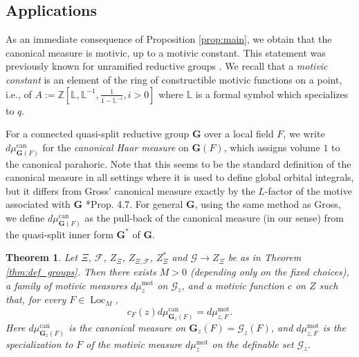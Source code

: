 \documentclass{amsart}
\newcommand{\Z}{{\mathbb Z}}
\newcommand{\cF}{\mathcal{F}}
\newcommand{\cG}{\mathcal{G}}
\DeclareMathOperator{\loc}{Loc}
\newcommand{\bG}{\mathbf{G}}
\newcommand{\can}{\mathrm{can}}
\newcommand\lef{\mathbb L}
\newcommand\mot{\mathrm{mot}}
\theoremstyle{plain}
\newtheorem{theorem}[thm]{Theorem}
\theoremstyle{definition}
\begin{document}
\subsection{Applications} 
As an immediate consequence of Proposition \ref{prop:main}, we obtain that the canonical measure is motivic, up to a motivic constant.
This statement was previously known for unramified reductive groups \cite{cluckers-hales-loeser}.
We recall that a \emph{motivic constant} is an element of the ring of constructible motivic functions on a point,
i.e., of $A:=\Z[\lef, \lef^{-1}, \frac{1}{1-\lef^{-i}}, i>0]$ where $\lef$ is a formal symbol which specializes to $q$.

For a connected quasi-split reductive group $\bG$ over a local field $F$, we write
$d\mu_{\bG(F)}^\can$ for the \emph{canonical Haar measure}
on $\bG(F)$, which assigns volume $1$ to the canonical parahoric. 
Note that this seems to be the standard definition of the canonical measure in all settings
where it is used to define global orbital integrals, but it differs from Gross' canonical measure
exactly by the $L$-factor of the motive associated with $\bG$ \cite{gross:97a}*{Prop. 4.7}.
For general $\bG$, using the same method as Gross, 
we define $d\mu_{\bG(F)}^\can$ as the pull-back of the canonical measure (in our sense)
from the quasi-split inner form $\bG^\ast$ of $\bG$.  

\begin{theorem}\label{thm:mot_meas}
 Let $\Xi$, $\cF$, $Z_\Xi$, $Z_{\Xi,\cF}$, $Z^\ast_\Xi$  and $\cG \to Z_\Xi$ be as in Theorem \ref{thm:def_groups}. 
Then there exists $M>0$ (depending only on the fixed choices), a family of  motivic measures
$d\mu_z^\mot$ on $\cG_z$, and a motivic function $c$ on $Z$ such that, for every $F\in \loc_M$,
\[
c_F(z) d\mu_{\bG_z(F)}^\can = d\mu_{z, F}^\mot.
\]
Here $d\mu_{\bG_z(F)}^\can$ is the canonical measure on $\bG_z(F)=\cG_z(F)$,
and $d\mu_{z, F}^\mot$ is the specialization to $F$ of the motivic measure $d\mu_z^\mot$ on the definable set $\cG_z$. 
\end{theorem} 
\end{document}
